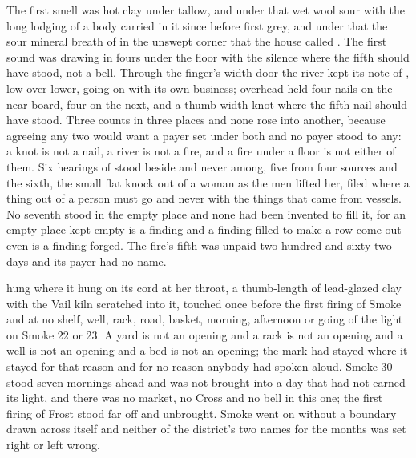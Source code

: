 The first smell was hot clay under tallow, and under that wet wool sour with the long lodging of a body carried in it since before first grey, and under that the sour mineral breath of  in the unswept corner that the house called . The first sound was  drawing in fours under the floor with the silence where the fifth should have stood, not a bell. Through the finger's-width door the river kept its note of , low over lower, going on with its own business; overhead  held four nails on the near board, four on the next, and a thumb-width knot where the fifth nail should have stood. Three counts in three places and none rose into another, because agreeing any two would want a payer set under both and no payer stood to any: a knot is not a nail, a river is not a fire, and a fire under a floor is not either of them. Six hearings of  stood beside and never among, five from four sources and the sixth, the small flat knock out of a woman as the men lifted her, filed where a thing out of a person must go and never with the things that came from vessels. No seventh stood in the empty place and none had been invented to fill it, for an empty place kept empty is a finding and a finding filled to make a row come out even is a finding forged. The fire's fifth was unpaid two hundred and sixty-two days and its payer had no name.

 hung where it hung on its cord at her throat, a thumb-length of lead-glazed clay with the Vail kiln scratched into it, touched once before the first firing of Smoke and at no shelf, well, rack, road, basket, morning, afternoon or going of the light on Smoke 22 or 23. A yard is not an opening and a rack is not an opening and a well is not an opening and a bed is not an opening; the mark had stayed where it stayed for that reason and for no reason anybody had spoken aloud. Smoke 30 stood seven mornings ahead and was not brought into a day that had not earned its light, and there was no market, no Cross and no bell in this one; the first firing of Frost stood far off and unbrought. Smoke went on without a boundary drawn across itself and neither of the district's two names for the months was set right or left wrong.

\scenebreak

